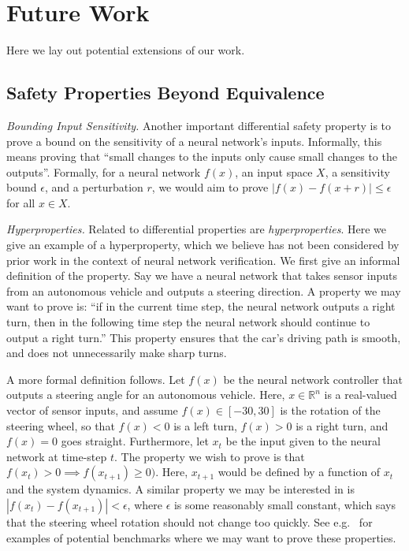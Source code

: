 \section{Future Work}
Here we lay out potential extensions of our work.

\subsection{Safety Properties Beyond Equivalence}
\textit{Bounding Input Sensitivity.} Another important differential safety
property is to prove a bound on the sensitivity of a neural network's
inputs. Informally, this means proving that ``small changes to the inputs
only cause small changes to the outputs''. Formally, for a neural network $
f(x) $, an input space $ X $, a sensitivity bound $ \epsilon $, and a
perturbation $ r $, we would aim to prove $ |f(x) - f(x + r)| \leq \epsilon
$ for all $ x \in X $.

\textit{Hyperproperties.} Related to differential properties are
\textit{hyperproperties}. Here we give an example of a hyperproperty, which
we believe has not been considered by prior work in the context of neural
network verification. We first give an informal definition of the property. Say
we have a neural network that takes sensor
inputs from an autonomous vehicle and outputs a steering direction. A
property we may want to prove is:
``if in the current time step, the neural network outputs a right turn, then in
the following time step the neural network should continue to output a right
turn.''
This property ensures that the car's driving path is smooth, and
does not unnecessarily make sharp turns.


A more formal definition follows. Let $ f(x) $ be the neural network controller
that outputs a steering angle for an autonomous vehicle. Here, $ x \in
\mathbb{R}^n $ is a
real-valued vector of sensor inputs, and assume $ f(x) \in [-30, 30] $ is
the rotation of the steering wheel, so that $ f(x) < 0 $ is a left turn, $
f(x) > 0 $ is a right turn, and $ f(x) = 0 $ goes straight. Furthermore,
let $ x_t $ be the input given to the neural network at time-step $ t $.
The property we wish to prove is that $ f(x_t) > 0 \implies f(x_{t+1}) \geq
0) $. Here, $ x_{t+1} $ would be defined by a function of $ x_t $ and the system
dynamics. A similar property we may be interested in is
$ |f(x_t) - f(x_{t+1})| < \epsilon $, where $ \epsilon $ is some reasonably small
constant, which says that the steering wheel rotation should not change too
quickly.
See e.g.~\cite{hu2020reach} for examples of potential benchmarks where we may
want to prove these properties.

